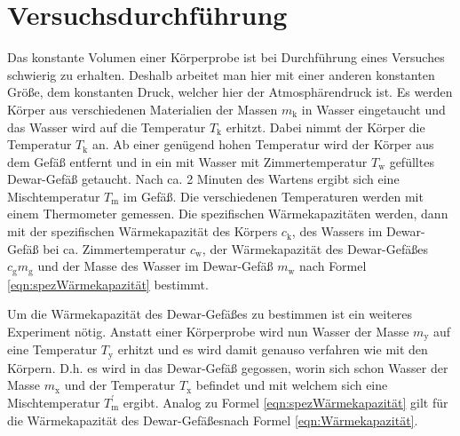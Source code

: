 \documentclass[titlepage = firstcover]{scrartcl}
\begin{document}
          \section{Versuchsdurchführung}
        Das konstante Volumen einer Körperprobe ist bei Durchführung eines Versuches schwierig zu erhalten.
        Deshalb arbeitet man hier mit einer anderen konstanten Größe, dem konstanten Druck, welcher hier
        der Atmosphärendruck ist. Es werden Körper aus verschiedenen Materialien der Massen $m_\text{k}$ in Wasser
        eingetaucht und das Wasser wird auf die Temperatur $T_\text{k}$ erhitzt. Dabei nimmt der Körper die Temperatur $T_\text{k}$ an. Ab einer genügend hohen Temperatur
        wird der Körper aus dem Gefäß entfernt und in ein mit Wasser mit Zimmertemperatur $T_\text{w}$ gefülltes
        Dewar-Gefäß getaucht. Nach ca. 2 Minuten des Wartens ergibt sich eine Mischtemperatur $T_\text{m}$ im Gefäß.
        Die verschiedenen Temperaturen werden mit einem Thermometer gemessen.
        Die spezifischen Wärmekapazitäten werden, dann mit der spezifischen Wärmekapazität des Körpers $c_\text{k}$, des Wassers im Dewar-Gefäß bei ca. Zimmertemperatur
        $c_\text{w}$, der Wärmekapazität des Dewar-Gefäßes $c_\text{g}m_\text{g}$ und der Masse des Wasser im Dewar-Gefäß
        $m_\text{w}$ nach Formel \eqref{eqn:spezWärmekapazität} bestimmt.

        Um die Wärmekapazität des Dewar-Gefäßes zu bestimmen ist ein weiteres Experiment nötig. Anstatt einer Körperprobe
        wird nun Wasser der Masse $m_\text{y}$ auf eine Temperatur $T_\text{y}$ erhitzt und es wird damit genauso verfahren wie mit den Körpern.
        D.h. es wird in das Dewar-Gefäß gegossen, worin sich schon Wasser der Masse $m_\text{x}$ und der Temperatur
        $T_\text{x}$ befindet und mit welchem sich eine Mischtemperatur $T_\text{m}^{'}$ ergibt. Analog zu Formel
        \eqref{eqn:spezWärmekapazität} gilt für die Wärmekapazität des Dewar-Gefäßesnach Formel \eqref{eqn:Wärmekapazität}.
\end{document}
